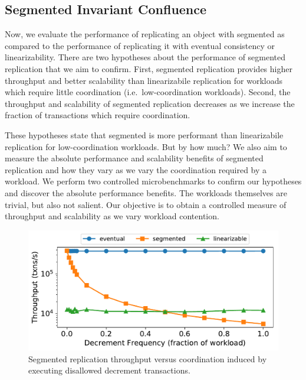 \subsection{Segmented Invariant Confluence}%
Now, we evaluate the performance of replicating an object with segmented
\invariantconfluence{} as compared to the performance of replicating it with
eventual consistency or linearizability.
%
There are two hypotheses about the performance of segmented
\invariantconfluent{} replication that we aim to confirm.
%
First, segmented \invariantconfluent{} replication provides higher throughput
and better scalability than linearizabile replication for workloads which
require little coordination (i.e.\ low-coordination workloads).
%
Second, the throughput and scalability of segmented \invariantconfluent{}
replication decreases as we increase the fraction of transactions which require
coordination.

These hypotheses state that segmented \invariantconfluent{} is more performant
than linearizabile replication for low-coordination workloads. But by how much?
We also aim to measure the absolute performance and scalability benefits of
segmented \invariantconfluent{} replication and how they vary as we vary the
coordination required by a workload. We perform two controlled microbenchmarks
to confirm our hypotheses and discover the absolute performance benefits. The
workloads themselves are trivial, but also not salient. Our objective is to
obtain a controlled measure of throughput and scalability as we vary workload
contention.

\begin{figure}[t]
  \centering
  \includegraphics[width=\columnwidth]{figures/throughput_vs_fraction_16.pdf}
  \caption{%
    Segmented \invariantconfluent{} replication throughput versus coordination
    induced by executing disallowed decrement transactions.
  }
\end{figure}

